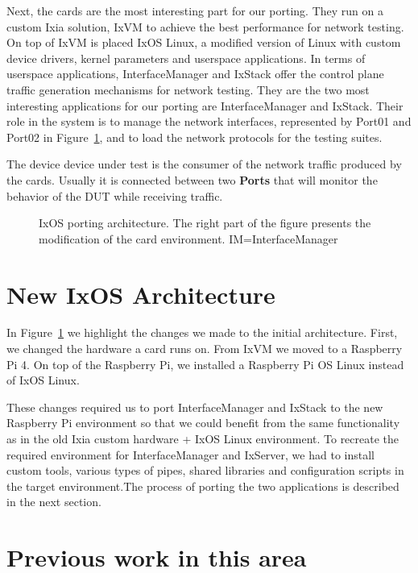 Next, the cards are the most interesting part for our porting. They run on a
custom Ixia solution, IxVM to achieve the best performance for network testing.
On top of IxVM is placed IxOS Linux, a modified version of Linux with custom
device drivers, kernel parameters and userspace applications. In terms of
userspace applications, InterfaceManager and IxStack offer the control
plane traffic generation mechanisms for network testing. They are the two most
interesting applications for our porting are InterfaceManager and IxStack.
Their role in the system is to manage the network interfaces, represented by
Port01 and Port02 in Figure~\ref{fig:ixos_arch}, and to load the network
protocols for the testing suites.

The device device under test is the consumer of the network traffic produced by
the cards. Usually it is connected between two \textbf{Ports} that will monitor the
behavior of the DUT while receiving traffic.

\begin{figure}
    \centering
    \def\svgscale{0.95}
    
    \caption{IxOS porting architecture. The right part of the figure presents
    the modification of the card environment. \small{IM=InterfaceManager}}
    \label{fig:ixos_arch}
    \medskip
    \small
\end{figure}

\section{New IxOS Architecture}

In Figure~\ref{fig:ixos_arch} we highlight the changes we made to the initial
architecture. First, we changed the hardware a card runs on. From IxVM we moved
to a Raspberry Pi 4. On top of the Raspberry Pi, we installed a Raspberry Pi OS Linux
instead of IxOS Linux.

These changes required us to port InterfaceManager and IxStack to the new
Raspberry Pi environment so that we could benefit from the same functionality as
in the old Ixia custom hardware + IxOS Linux environment. To recreate the
required environment for InterfaceManager and IxServer, we had to install custom tools,
various types of pipes, shared libraries and configuration scripts in the target
environment.The process of porting the two applications is described in the next
section.

\section{Previous work in this area}

